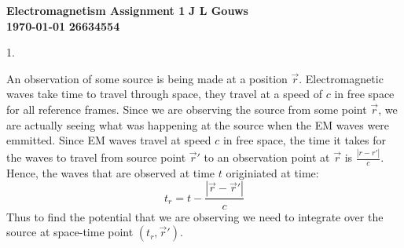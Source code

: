 \documentclass[a4paper,12pt]{article}
\newcommand\block[1]{\hspace*{#1}}
\begin{document}
\selectfont
{\Large \textbf{Electromagnetism Assignment 1}} \hfill {\Large \textbf{J L Gouws}}\\
\block{1.0cm} {\large \textbf{\today}} \hfill {\large \textbf{26634554}}\\
\thispagestyle{empty}

1.
\begin{minipage}[t]{0.90\textwidth}
  An observation of some source is being made at a position $\vec{r}$.
  Electromagnetic waves take time to travel through space, they travel at a speed of $c$ in free space for all reference frames.
  Since we are observing the source from some point $\vec{r}$, we are actually seeing what was happening at the source when the EM waves were emmitted.
  Since EM waves travel at speed $c$ in free space, the time it takes for the waves to travel from source point $\vec{r}'$ to an observation point at $\vec{r}$ is $\frac{|r - r'|}{c}$.
  Hence, the waves that are observed at time $t$ originiated at time:
  \begin{equation*}
    t_r = t - \frac{|\vec{r} - \vec{r}'|}{c}
  \end{equation*}
  Thus to find the potential that we are observing we need to integrate over the source at space-time point $(t_r, \vec{r}')$.\\
\end{minipage}
\end{document}
